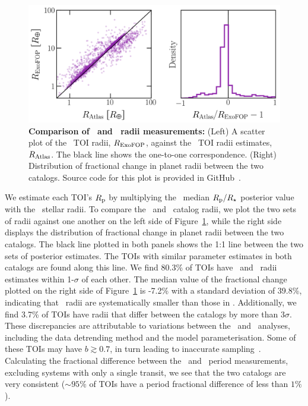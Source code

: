 \documentclass[floatfix,ApJL,twocolumn]{aastex631}
\begin{document}
\begin{figure}\label{fig:frac_diff}
  \includegraphics[width=\linewidth]{figures/radius_error.png}
  \caption{\textbf{Comparison of \exofop\ and \tessAtlas\ radii measurements:} (Left) A scatter plot of the \exofop\ TOI radii, $R_{\rm ExoFOP}$, against the \tessAtlas\ TOI radii estimates, $R_{\rm Atlas}$. 
  The black line shows the one-to-one correspondence. 
  (Right) Distribution of fractional change in planet radii between the two catalogs.
  Source code for this plot is provided in GitHub~\paperPlotsLink.
  }
\end{figure}

We estimate each TOI's $R_{\rm p}$ by multiplying the \tessAtlas\  median $R_{\rm p}/R_{\star}$ posterior value with the \mast\ stellar radii.  
To compare the \tessAtlas\  and \exofop\ catalog radii, we plot the two sets of radii against one another on the left side of Figure~\ref{fig:frac_diff}, while the right side displays the distribution of fractional change in planet radii between the two catalogs.
The black line plotted in both panels shows the 1:1 line between the two sets of posterior estimates.
The TOIs with similar parameter estimates in both catalogs are found along this line. 
We find 80.3\% of TOIs have \tessAtlas\ and \exofop\ radii estimates within 1-$\sigma$ of each other.
The median value of the fractional change plotted on the right side of  Figure~\ref{fig:frac_diff} is -7.2\% with a standard deviation of 39.8\%, indicating that \tessAtlas\ radii are systematically smaller than those in \exofop.
Additionally, we find 3.7\% of TOIs have radii that differ between the catalogs by more than $3\sigma$.
These discrepancies are attributable to variations between the \tessAtlas\ and \exofop\ analyses, including the data detrending method  and the model parameterisation. 
Some of these TOIs may have $b\gtrsim0.7$, in turn leading to inaccurate sampling~\citep[see e.g.][]{Thompson:2018:ApJS, Gilbert:2022:AJ}.
Calculating the fractional difference between the \exofop\ and \tessAtlas\ period measurements, excluding systems with only a single transit, we see that the two catalogs are very consistent ($\sim95\%$ of TOIs have a period fractional difference of less than $1\%$). 
\end{document}

